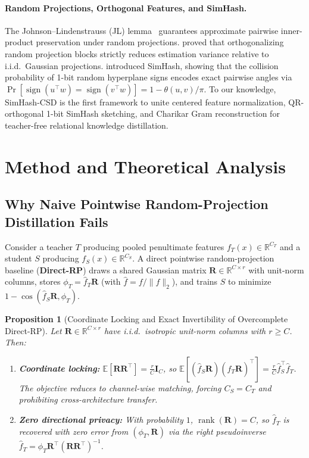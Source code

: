 \documentclass{article}
\newtheorem{proposition}{Proposition}
\begin{document}
\paragraph{Random Projections, Orthogonal Features, and SimHash.}
The Johnson--Lindenstrauss (JL) lemma~\citep{johnson1984extensions,ghojogh2021johnson} guarantees approximate pairwise inner-product preservation under random projections. \citet{choromanski2017unreasonable} proved that orthogonalizing random projection blocks strictly reduces estimation variance relative to i.i.d.\ Gaussian projections. \citet{charikar2002similarity} introduced SimHash, showing that the collision probability of 1-bit random hyperplane signs encodes exact pairwise angles via $\Pr[\operatorname{sign}(u^\top w)=\operatorname{sign}(v^\top w)] = 1 - \theta(u,v)/\pi$. To our knowledge, SimHash-CSD is the first framework to unite centered feature normalization, QR-orthogonal 1-bit SimHash sketching, and Charikar Gram reconstruction for teacher-free relational knowledge distillation.

\section{Method and Theoretical Analysis}
\label{sec:method}

\subsection{Why Naive Pointwise Random-Projection Distillation Fails}

Consider a teacher $T$ producing pooled penultimate features $f_T(x)\in\mathbb{R}^{C_T}$ and a student $S$ producing $f_S(x)\in\mathbb{R}^{C_S}$. A direct pointwise random-projection baseline (\textbf{Direct-RP}) draws a shared Gaussian matrix $\mathbf{R}\in\mathbb{R}^{C\times r}$ with unit-norm columns, stores $\phi_T = \hat{f}_T \mathbf{R}$ (with $\hat{f}=f/\|f\|_2$), and trains $S$ to minimize $1-\cos(\hat{f}_S\mathbf{R}, \phi_T)$.

\begin{proposition}[Coordinate Locking and Exact Invertibility of Overcomplete Direct-RP]
\label{prop:direct_rp}
Let $\mathbf{R}\in\mathbb{R}^{C\times r}$ have i.i.d.\ isotropic unit-norm columns with $r \ge C$. Then:
\begin{enumerate}
    \item \textbf{Coordinate locking:} $\mathbb{E}[\mathbf{R}\mathbf{R}^\top] = \frac{r}{C}\mathbf{I}_C$, so $\mathbb{E}[(\hat{f}_S\mathbf{R})(\hat{f}_T\mathbf{R})^\top] = \frac{r}{C}\hat{f}_S^\top\hat{f}_T$. The objective reduces to channel-wise matching, forcing $C_S = C_T$ and prohibiting cross-architecture transfer.
    \item \textbf{Zero directional privacy:} With probability $1$, $\operatorname{rank}(\mathbf{R}) = C$, so $\hat{f}_T$ is recovered with zero error from $(\phi_T, \mathbf{R})$ via the right pseudoinverse $\hat{f}_T = \phi_T \mathbf{R}^\top (\mathbf{R}\mathbf{R}^\top)^{-1}$.
\end{enumerate}
\end{proposition}
\end{document}
